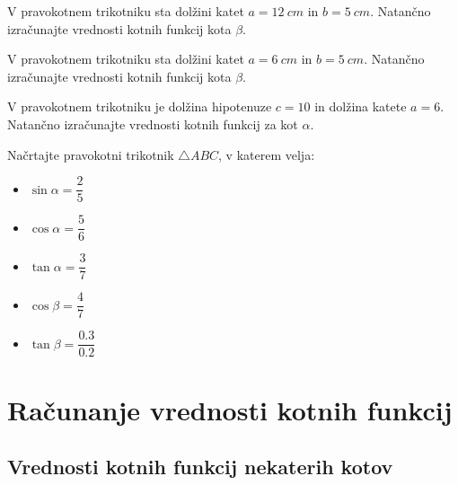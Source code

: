         



        
            \begin{naloga}
                V pravokotnem trikotniku sta dolžini katet $a=12~cm$ in $b=5~cm$. 
                Natančno izračunajte vrednosti kotnih funkcij kota $\beta$.
            \end{naloga}


            \begin{naloga}
                V pravokotnem trikotniku sta dolžini katet $a=6~cm$ in $b=5~cm$. 
                Natančno izračunajte vrednosti kotnih funkcij kota $\beta$.
            \end{naloga}


            \begin{naloga}
                V pravokotnem trikotniku je dolžina hipotenuze $c=10$ in dolžina katete $a=6$. 
                Natančno izračunajte vrednosti kotnih funkcij za kot $\alpha$.
            \end{naloga}

        


        
            \begin{naloga}
                Načrtajte pravokotni trikotnik $\triangle ABC$, v katerem velja:
                \begin{itemize}
                    \item $\displaystyle \sin\alpha=\dfrac{2}{5}$ 
                    \item $\displaystyle \cos\alpha=\dfrac{5}{6}$ 
                    \item $\displaystyle \tan\alpha=\dfrac{3}{7}$ 
                    \item $\displaystyle \cos\beta=\dfrac{4}{7}$ 
                    \item $\displaystyle \tan\beta=\dfrac{0.3}{0.2}$ 
                \end{itemize}
            \end{naloga}

        




    \section{Računanje vrednosti kotnih funkcij}

        
            \subsection{Vrednosti kotnih funkcij nekaterih kotov}

